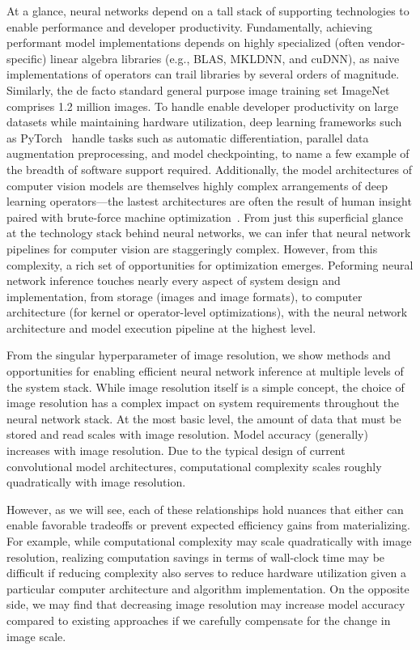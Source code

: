 At a glance, neural networks depend on a tall stack of supporting technologies to enable performance and developer productivity.
Fundamentally, achieving performant model implementations depends on highly specialized (often vendor-specific) linear algebra libraries (e.g., BLAS, MKLDNN, and cuDNN), as naive implementations of operators can trail libraries by several orders of magnitude.
Similarly, the de facto standard general purpose image training set ImageNet~\cite{russakovsky2015imagenet} comprises 1.2 million images.
To handle enable developer productivity on large datasets while maintaining hardware utilization, deep learning frameworks such as PyTorch~\cite{paszke2019pytorch} handle tasks such as automatic differentiation, parallel data augmentation preprocessing, and model checkpointing, to name a few example of the breadth of software support required.
Additionally, the model architectures of computer vision models are themselves highly complex arrangements of deep learning operators---the lastest architectures are often the result of human insight paired with brute-force machine optimization~\cite{tan2019efficientnet, real2019regularized, liu2018darts}.
From just this superficial glance at the technology stack behind neural networks, we can infer that neural network pipelines for computer vision are staggeringly complex.
However, from this complexity, a rich set of opportunities for optimization emerges.
Peforming neural network inference touches nearly every aspect of system design and implementation, from storage (images and image formats), to computer architecture (for kernel or operator-level optimizations), with the neural network architecture and model execution pipeline at the highest level.

From the singular hyperparameter of image resolution, we show methods and opportunities for enabling efficient neural network inference at multiple levels of the system stack.
While image resolution itself is a simple concept, the choice of image resolution has a complex impact on system requirements throughout the neural network stack.
At the most basic level, the amount of data that must be stored and read scales with image resolution.
Model accuracy (generally) increases with image resolution.
Due to the typical design of current convolutional model architectures, computational complexity scales roughly quadratically with image resolution.

However, as we will see, each of these relationships hold nuances that either can enable favorable tradeoffs or prevent expected efficiency gains from materializing.
For example, while computational complexity may scale quadratically with image resolution, realizing computation savings in terms of wall-clock time may be difficult if reducing complexity also serves to reduce hardware utilization given a particular computer architecture and algorithm implementation.
On the opposite side, we may find that decreasing image resolution may increase model accuracy compared to existing approaches if we carefully compensate for the change in image scale.


